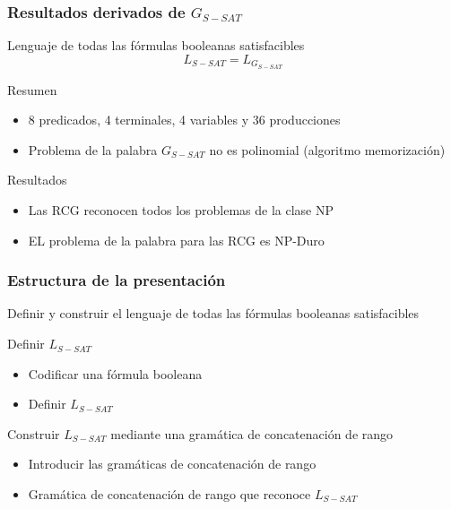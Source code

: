 \documentclass{beamer}
\begin{document}
\begin{frame}
    \frametitle{Resultados derivados de $G_{S-SAT}$}

    \begin{block}{Lenguaje de todas las fórmulas booleanas satisfacibles}
        $$L_{S-SAT} = L_{G_{S-SAT}}$$
    \end{block}
    \pause
    \begin{block}{Resumen}
        \begin{itemize}
            \item 8 predicados, 4 terminales, 4 variables y 36 producciones
                  \pause
            \item Problema de la palabra $G_{S-SAT}$ no es polinomial (algoritmo memorización)
        \end{itemize}
    \end{block}
    \pause
    \begin{block}{Resultados}
        \begin{itemize}
            \item Las RCG reconocen todos los problemas de la clase NP
                  \pause
            \item EL problema de la palabra para las RCG es NP-Duro
        \end{itemize}
    \end{block}

\end{frame}

\begin{frame}
    \frametitle{Estructura de la presentación}

    Definir y construir el lenguaje de todas las fórmulas booleanas satisfacibles


    \begin{block}{Definir $L_{S-SAT}$}
        \begin{itemize}
            \item Codificar una fórmula booleana
            \item Definir $L_{S-SAT}$
        \end{itemize}
    \end{block}

    \begin{block}{Construir $L_{S-SAT}$ mediante una gramática de concatenación de rango}
        \begin{itemize}
            \item Introducir las gramáticas de concatenación de rango
            \item Gramática de concatenación de rango que reconoce $L_{S-SAT}$
        \end{itemize}
    \end{block}
\end{frame}
\end{document}
